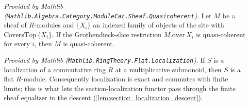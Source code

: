 \begin{lemma}
  \label{lem:isQuasicoherent_of_coversTop_mathlib}
  \mathlibok
  \textit{Provided by Mathlib
  (\texttt{Mathlib.Algebra.Category.ModuleCat.Sheaf.Quasicoherent}).}
  Let \(M\) be a sheaf of \(R\)-modules and \(\{X_i\}\) an indexed family of objects of the site with
  \(\mathrm{CoversTop}\,\{X_i\}\). If the Grothendieck-slice restriction \(M.\mathrm{over}\,X_i\) is
  quasi-coherent for every \(i\), then \(M\) is quasi-coherent.
\end{lemma}

\begin{lemma}
  \label{lem:isLocalization_flat_mathlib}
  \mathlibok
  \textit{Provided by Mathlib (\texttt{Mathlib.RingTheory.Flat.Localization}).}
  If \(S\) is a localization of a commutative ring \(R\) at a multiplicative submonoid, then \(S\) is
  a flat \(R\)-module. Consequently localization is exact and commutes with finite limits; this is
  what lets the section-localization functor pass through the finite sheaf equalizer in the descent
  (\cref{lem:section_localization_descent}).
\end{lemma}


